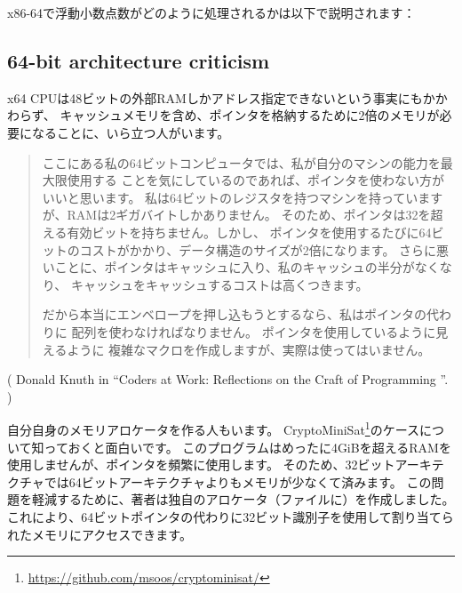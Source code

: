 x86-64で浮動小数点数がどのように処理されるかは以下で説明されます：

\subsection{64-bit architecture criticism}

x64 \ac{CPU}は48ビットの外部\ac{RAM}しかアドレス指定できないという事実にもかかわらず、
キャッシュメモリを含め、ポインタを格納するために2倍のメモリが必要になることに、いら立つ人がいます。

\begin{framed}
\begin{quotation}
ここにある私の64ビットコンピュータでは、私が自分のマシンの能力を最大限使用する
ことを気にしているのであれば、ポインタを使わない方がいいと思います。
私は64ビットのレジスタを持つマシンを持っていますが、RAMは2ギガバイトしかありません。
そのため、ポインタは32を超える有効ビットを持ちません。しかし、
ポインタを使用するたびに64ビットのコストがかかり、データ構造のサイズが2倍になります。 
さらに悪いことに、ポインタはキャッシュに入り、私のキャッシュの半分がなくなり、
キャッシュをキャッシュするコストは高くつきます。

だから本当にエンベロープを押し込もうとするなら、私はポインタの代わりに
配列を使わなければなりません。 ポインタを使用しているように見えるように
複雑なマクロを作成しますが、実際は使ってはいません。
\end{quotation}
\end{framed}

( Donald Knuth in ``Coders at Work: Reflections on the Craft of Programming ''. )

自分自身のメモリアロケータを作る人もいます。 
CryptoMiniSat\footnote{\url{https://github.com/msoos/cryptominisat/}}のケースについて知っておくと面白いです。
このプログラムはめったに4GiBを超える\ac{RAM}を使用しませんが、ポインタを頻繁に使用します。
そのため、32ビットアーキテクチャでは64ビットアーキテクチャよりもメモリが少なくて済みます。
この問題を軽減するために、著者は独自のアロケータ（ファイルに）を作成しました。
これにより、64ビットポインタの代わりに32ビット識別子を使用して割り当てられたメモリにアクセスできます。
